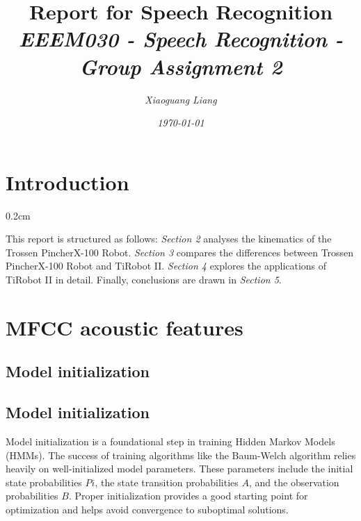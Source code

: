 \documentclass{article}
\newcommand{\setParDis}{\setlength {\parskip} {0.2cm} } %
\begin{document}
\title{%
Report for Speech Recognition \\
\large\itshape{EEEM030 - Speech Recognition - Group Assignment 2}}
\author{\normalsize\slshape{Xiaoguang Liang}}
\date{\normalsize\slshape\today}
\maketitle


\suppressfloats

\tableofcontents

\begin{abstract}


\end{abstract}


\section{Introduction}
\setParDis

This report is structured as follows: \textit{Section 2} analyses the kinematics of the Trossen PincherX-100 Robot. \textit{Section 3} compares the differences between Trossen PincherX-100 Robot and TiRobot II. \textit{Section 4} explores the applications of TiRobot II in detail. Finally, conclusions are drawn in \textit{Section 5}.


\section{MFCC acoustic features}


\subsection{Model initialization}



\subsection{Model initialization}
Model initialization is a foundational step in training Hidden Markov Models (HMMs). The success of training algorithms like the Baum-Welch algorithm relies heavily on well-initialized model parameters. These parameters include the initial state probabilities $Pi$, the state transition probabilities $A$, and the observation probabilities $B$. Proper initialization provides a good starting point for optimization and helps avoid convergence to suboptimal solutions. 
\end{document}
